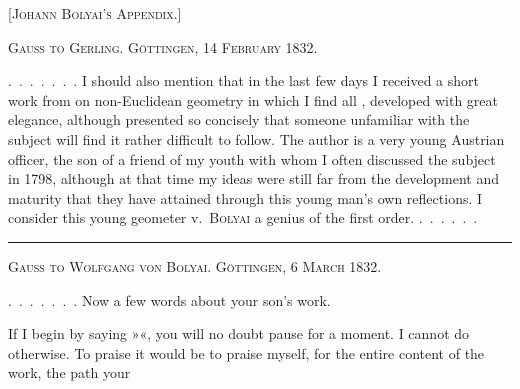 \clearpage
{}%
\begin{center}\Large\textsc{[Johann Bolyai's Appendix.]}\end{center}
\bigskip
\begin{center}\textsc{Gauss to Gerling. Göttingen, 14 February 1832.}\end{center}
\mbox{.\ .\ .\ .\ .\ .\ .} I should also mention that in the last few days I received a short work from  on non-Euclidean geometry in which I find all , developed with great elegance, although presented so concisely that someone unfamiliar with the subject will find it rather difficult to follow. The author is a very young Austrian officer, the son of a friend of my youth with whom I often discussed the subject in 1798, although at that time my ideas were still far from the development and maturity that they have attained through this young man's own reflections. I consider this young geometer v.~\textsc{Bolyai} a genius of the first order. \mbox{.\ .\ .\ .\ .\ .}

\bigskip
\begin{center}\rule{.25\textwidth}{.3pt}\end{center}
\bigskip
\begin{center}\textsc{Gauss to Wolfgang von Bolyai. Göttingen, 6 March 1832.}\end{center}
\mbox{.\ .\ .\ .\ .\ .\ .} Now a few words about your son's work.

If I begin by saying »«, you will no doubt pause for a moment. I cannot do otherwise. To praise it would be to praise myself, for the entire content of the work, the path your
